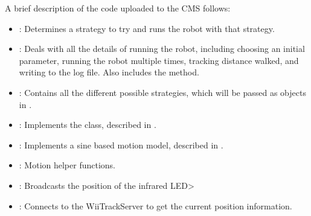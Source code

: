 A brief description of the code uploaded to the CMS follows:

\begin{itemize}
\item {}: Determines a strategy to try and runs the robot
  with that strategy.
\item {}: Deals with all the details of running the robot,
  including choosing an initial parameter, running the robot multiple times, 
  tracking distance walked, and writing to the log file. Also includes the
   method.
\item {}: Contains all the different possible strategies, which
  will be passed as objects in . 
\item {}: Implements the  class, described in
  .
\item {}: Implements a sine based motion model,
  described in .
\item {}: Motion helper functions.
\item {}: Broadcasts the position of the infrared LED>
\item {}: Connects to the WiiTrackServer to get the current position information.
\end{itemize}
